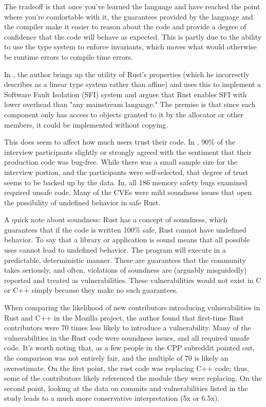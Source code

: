 \documentclass[conference]{IEEEtran}
\begin{document}
The tradeoff is that once you've learned the language and have reached the point where you're comfortable with it, the guarantees provided by the language and the compiler make it easier to reason about the code and provide a degree of confidence that the code will behave as expected. This is partly due to the ability to use the type system to enforce invariants, which moves what would otherwise be runtime errors to compile time errors\cite{nosedaRustSecureIoT2022}.

In \cite{balasubramanianSystemProgrammingRust2017}, the author brings up the utility of Rust's properties (which he incorrectly describes as a linear type system rather than affine) and uses this to implement a Software Fault Isolation (SFI) system and argues that Rust enables SFI with lower overhead than "any mainstream language." The premise is that since each component only has access to objects granted to it by the allocator or other members, it could be implemented without copying.

This does seem to affect how much users trust their code. In \cite{fultonBenefitsDrawbacksAdopting2021}, 90\% of the interview participants slightly or strongly agreed with the sentiment that their production code was bug-free. While there was a small sample size for the interview portion, and the participants were self-selected, that degree of trust seems to be backed up by the data. In\cite{xuMemorySafetyChallengeConsidered2021}, all 186 memory safety bugs examined required unsafe code. Many of the CVEs were mild soundness issues that open the possibility of undefined behavior in safe Rust.

A quick note about soundness: Rust has a concept of soundness, which guarantees that if the code is written 100\% safe, Rust cannot have undefined behavior. To say that a library or application is sound means that all possible uses cannot lead to undefined behavior. The program will execute in a predictable, deterministic manner. These are guarantees that the community takes seriously, and often, violations of soundness are (arguably misguidedly) reported and treated as vulnerabilities\cite{xuMemorySafetyChallengeConsidered2021}\cite{traceyGradingCurveHow2023}.
These vulnerabilities would not exist in C or C++ simply because they make no such guarantees.

When comparing the likelihood of new contributors introducing vulnerabilities in Rust and C++ in the Mozilla project, the author found that first-time Rust contributors were 70 times less likely to introduce a vulnerability. Many of the vulnerabilities in the Rust code were soundness issues, and all required unsafe code\cite{traceyGradingCurveHow2023}. It's worth noting that, as a few people in the CPP subreddit pointed out, the comparison was not entirely fair, and the multiple of 70 is likely an overestimate. On the first point, the rust code was replacing C++ code; thus, some of the contributors likely referenced the module they
were replacing. On the second point, looking at the data on commits and vulnerabilities listed in the study leads to a much more conservative interpretation (5x or 6.5x).
\end{document}
